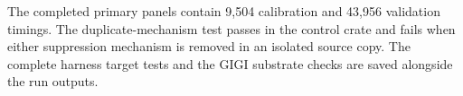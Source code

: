 The completed primary panels contain 9,504 calibration and 43,956 validation timings. The duplicate-mechanism test passes in the control crate and fails when either suppression mechanism is removed in an isolated source copy. The complete harness target tests and the GIGI substrate checks are saved alongside the run outputs.
